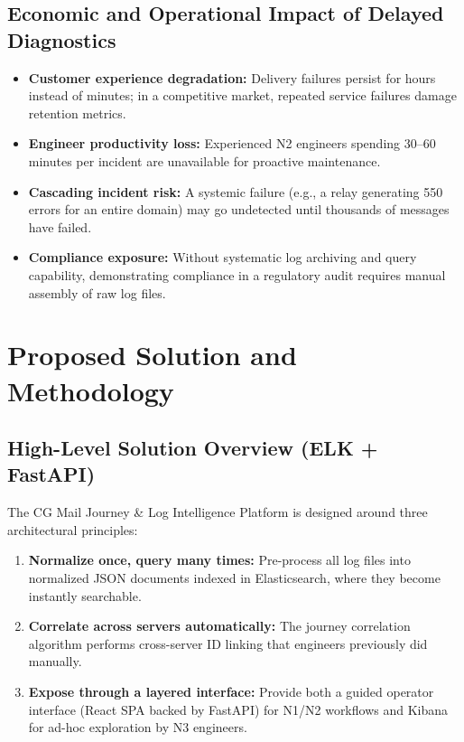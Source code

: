 \documentclass[12pt,a4paper,oneside]{report}
\begin{document}
\subsection{Economic and Operational Impact of Delayed Diagnostics}

\begin{itemize}
  \item \textbf{Customer experience degradation:} Delivery failures persist for hours instead of minutes; in a competitive market, repeated service failures damage retention metrics.
  \item \textbf{Engineer productivity loss:} Experienced N2 engineers spending 30--60 minutes per incident are unavailable for proactive maintenance.
  \item \textbf{Cascading incident risk:} A systemic failure (e.g., a relay generating 550 errors for an entire domain) may go undetected until thousands of messages have failed.
  \item \textbf{Compliance exposure:} Without systematic log archiving and query capability, demonstrating compliance in a regulatory audit requires manual assembly of raw log files.
\end{itemize}

\section{Proposed Solution and Methodology}

\subsection{High-Level Solution Overview (ELK + FastAPI)}

The CG Mail Journey \& Log Intelligence Platform is designed around three architectural principles:

\begin{enumerate}
  \item \textbf{Normalize once, query many times:} Pre-process all log files into normalized JSON documents indexed in Elasticsearch, where they become instantly searchable.
  \item \textbf{Correlate across servers automatically:} The journey correlation algorithm performs cross-server ID linking that engineers previously did manually.
  \item \textbf{Expose through a layered interface:} Provide both a guided operator interface (React SPA backed by FastAPI) for N1/N2 workflows and Kibana for ad-hoc exploration by N3 engineers.
\end{enumerate}
\end{document}
